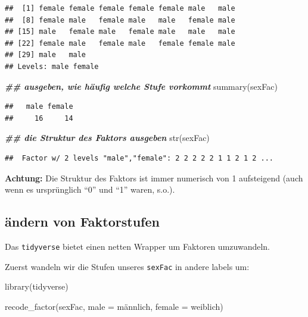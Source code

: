 \documentclass[
]{book}
\newenvironment{Shaded}{\begin{snugshade}}{\end{snugshade}}
\newcommand{\AttributeTok}[1]{\textcolor[rgb]{0.77,0.63,0.00}{#1}}
\newcommand{\DocumentationTok}[1]{\textcolor[rgb]{0.56,0.35,0.01}{\textbf{\textit{#1}}}}
\newcommand{\FunctionTok}[1]{\textcolor[rgb]{0.00,0.00,0.00}{#1}}
\newcommand{\NormalTok}[1]{#1}
\newcommand{\StringTok}[1]{\textcolor[rgb]{0.31,0.60,0.02}{#1}}
\begin{document}
\begin{verbatim}
##  [1] female female female female female male   male  
##  [8] female male   female male   male   female male  
## [15] male   female male   female male   male   male  
## [22] female male   female male   female female male  
## [29] male   male  
## Levels: male female
\end{verbatim}

\begin{Shaded}
\begin{Highlighting}[]
\DocumentationTok{\#\# ausgeben, wie häufig welche Stufe vorkommt}
\FunctionTok{summary}\NormalTok{(sexFac)}
\end{Highlighting}
\end{Shaded}

\begin{verbatim}
##   male female 
##     16     14
\end{verbatim}

\begin{Shaded}
\begin{Highlighting}[]
\DocumentationTok{\#\# die Struktur des Faktors ausgeben}
\FunctionTok{str}\NormalTok{(sexFac)  }
\end{Highlighting}
\end{Shaded}

\begin{verbatim}
##  Factor w/ 2 levels "male","female": 2 2 2 2 2 1 1 2 1 2 ...
\end{verbatim}

\textbf{Achtung:} Die Struktur des Faktors ist immer numerisch von 1 aufsteigend (auch wenn es ursprünglich ``0'' und ``1'' waren, s.o.).

\hypertarget{uxe4ndern-von-faktorstufen}{%
\subsection{ändern von Faktorstufen}\label{uxe4ndern-von-faktorstufen}}

Das \texttt{tidyverse} bietet einen netten Wrapper um Faktoren umzuwandeln.

Zuerst wandeln wir die Stufen unseres \texttt{sexFac} in andere labels um:

\begin{Shaded}
\begin{Highlighting}[]
\FunctionTok{library}\NormalTok{(tidyverse)}

\FunctionTok{recode\_factor}\NormalTok{(sexFac,}
              \AttributeTok{male =} \StringTok{\textquotesingle{}männlich\textquotesingle{}}\NormalTok{,}
              \AttributeTok{female =} \StringTok{\textquotesingle{}weiblich\textquotesingle{}}\NormalTok{)}
\end{Highlighting}
\end{Shaded}
\end{document}
